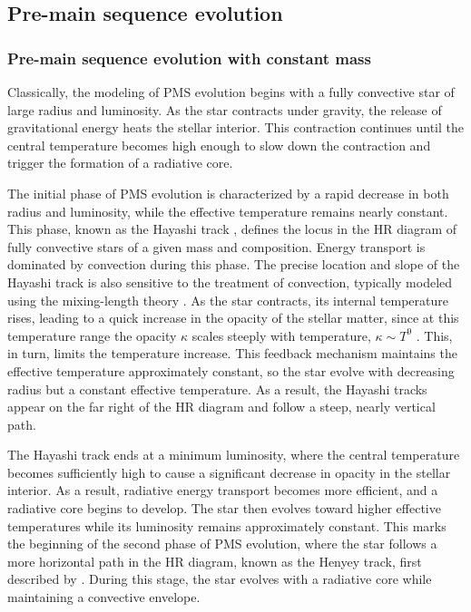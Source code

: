 \documentclass[12pt,a4paper]{article}
\begin{document}
\subsection{Pre-main sequence evolution}
\label{sec:pms_evolution}

\subsubsection{Pre-main sequence evolution with constant mass}
\label{sec:pms_const_mass}

Classically, the modeling of PMS evolution begins with a fully convective star of large radius and luminosity. As the star contracts under gravity, the release of gravitational energy heats the stellar interior. This contraction continues until the central temperature becomes high enough to slow down the contraction and trigger the formation of a radiative core.

The initial phase of PMS evolution is characterized by a rapid decrease in both radius and luminosity, while the effective temperature remains nearly constant. This phase, known as the Hayashi track \parencite{Hayashi1961}, defines the locus in the HR diagram of fully convective stars of a given mass and composition. Energy transport is dominated by convection during this phase. The precise location and slope of the Hayashi track is also sensitive to the treatment of convection, typically modeled using the mixing-length theory \parencite{CoxGiuli1968a}. As the star contracts, its internal temperature rises, leading to a quick increase in the opacity of the stellar matter, since at this temperature range the opacity $\kappa$ scales steeply with temperature, $\kappa \sim T^9$ \parencite{Maeder2009}. This, in turn, limits the temperature increase. This feedback mechanism maintains the effective temperature approximately constant, so the star evolve with decreasing radius but a constant effective temperature. As a result, the Hayashi tracks appear on the far right of the HR diagram and follow a steep, nearly vertical path.


The Hayashi track ends at a minimum luminosity, where the central temperature becomes sufficiently high to cause a significant decrease in opacity in the stellar interior. As a result, radiative energy transport becomes more efficient, and a radiative core begins to develop. The star then evolves toward higher effective temperatures while its luminosity remains approximately constant. This marks the beginning of the second phase of PMS evolution, where the star follows a more horizontal path in the HR diagram, known as the Henyey track, first described by \textcite{HenyeyEtAl1955}. During this stage, the star evolves with a radiative core while maintaining a convective envelope.
\end{document}
